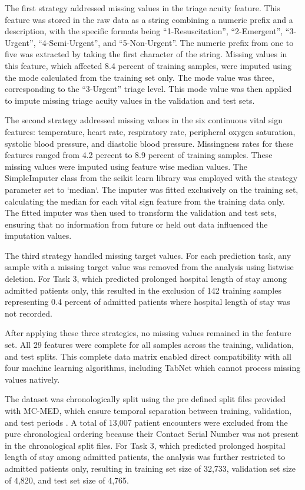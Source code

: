 \documentclass[harvard,article]{frontiersinFPHY_FAMS}
\begin{document}
The first strategy addressed missing values in the triage acuity feature. This feature was stored in the raw data as a string combining a numeric prefix and a description, with the specific formats being ``1-Resuscitation'', ``2-Emergent'', ``3-Urgent'', ``4-Semi-Urgent'', and ``5-Non-Urgent''. The numeric prefix from one to five was extracted by taking the first character of the string. Missing values in this feature, which affected 8.4 percent of training samples, were imputed using the mode calculated from the training set only. The mode value was three, corresponding to the ``3-Urgent'' triage level. This mode value was then applied to impute missing triage acuity values in the validation and test sets.

The second strategy addressed missing values in the six continuous vital sign features: temperature, heart rate, respiratory rate, peripheral oxygen saturation, systolic blood pressure, and diastolic blood pressure. Missingness rates for these features ranged from 4.2 percent to 8.9 percent of training samples. These missing values were imputed using feature wise median values. The SimpleImputer class from the scikit learn library \cite{pedregosa2011scikit} was employed with the strategy parameter set to `median`. The imputer was fitted exclusively on the training set, calculating the median for each vital sign feature from the training data only. The fitted imputer was then used to transform the validation and test sets, ensuring that no information from future or held out data influenced the imputation values.

The third strategy handled missing target values. For each prediction task, any sample with a missing target value was removed from the analysis using listwise deletion. For Task 3, which predicted prolonged hospital length of stay among admitted patients only, this resulted in the exclusion of 142 training samples representing 0.4 percent of admitted patients where hospital length of stay was not recorded.

After applying these three strategies, no missing values remained in the feature set. All 29 features were complete for all samples across the training, validation, and test splits. This complete data matrix enabled direct compatibility with all four machine learning algorithms, including TabNet which cannot process missing values natively.

The dataset was chronologically split using the pre defined split files provided with MC-MED, which ensure temporal separation between training, validation, and test periods \cite{kansal2025}. A total of 13,007 patient encounters were excluded from the pure chronological ordering because their Contact Serial Number was not present in the chronological split files. For Task 3, which predicted prolonged hospital length of stay among admitted patients, the analysis was further restricted to admitted patients only, resulting in training set size of 32,733, validation set size of 4,820, and test set size of 4,765.
\end{document}
